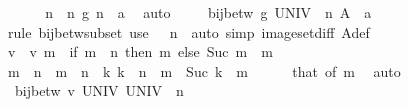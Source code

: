 \begin{isabellebody}
\ \ \isamarkupfalse%
\ {}\ \isamarkupfalse%
\ n\ \ n{\isacharcolon}{\kern0pt}\ {\isachardoublequoteopen}g\ n\ {\isacharequal}{\kern0pt}\ a{\isachardoublequoteclose}\ \isamarkupfalse%
\ auto\isanewline
\ \ \isamarkupfalse%
\ {}{\isacharcolon}{\kern0pt}\ {\isachardoublequoteopen}bij{\isacharunderscore}{\kern0pt}betw\ g\ {\isacharparenleft}{\kern0pt}UNIV\ {\isacharminus}{\kern0pt}\ {\isacharbraceleft}{\kern0pt}n{\isacharbraceright}{\kern0pt}{\isacharparenright}{\kern0pt}\ {\isacharparenleft}{\kern0pt}A{\isacharprime}{\kern0pt}\ {\isacharminus}{\kern0pt}\ {\isacharbraceleft}{\kern0pt}a{\isacharbraceright}{\kern0pt}{\isacharparenright}{\kern0pt}{\isachardoublequoteclose}\isanewline
\ \ \ \ \isamarkupfalse%
\ {\isacharparenleft}{\kern0pt}rule\ bij{\isacharunderscore}{\kern0pt}betw{\isacharunderscore}{\kern0pt}subset{\isacharparenright}{\kern0pt}\ {\isacharparenleft}{\kern0pt}use\ {}\ {}\ n\ \ {\isacartoucheopen}auto\ simp{\isacharcolon}{\kern0pt}\ image{\isacharunderscore}{\kern0pt}set{\isacharunderscore}{\kern0pt}diff\ A{\isacharprime}{\kern0pt}{\isacharunderscore}{\kern0pt}def{\isacartoucheclose}{\isacharparenright}{\kern0pt}\isanewline
\ \ \isamarkupfalse%
\ v\ \ {\isachardoublequoteopen}v\ m\ {\isacharequal}{\kern0pt}\ {\isacharparenleft}{\kern0pt}if\ m\ {\isacharless}{\kern0pt}\ n\ then\ m\ else\ Suc\ m{\isacharparenright}{\kern0pt}{\isachardoublequoteclose}\ \ m\isanewline
\ \ \isamarkupfalse%
\ {\isachardoublequoteopen}m\ {\isacharless}{\kern0pt}\ n\ {\isasymor}\ m\ {\isacharequal}{\kern0pt}\ n{\isachardoublequoteclose}\ \ {\isachardoublequoteopen}{\isasymAnd}k{\isachardot}{\kern0pt}\ k\ {\isacharless}{\kern0pt}\ n\ {\isasymor}\ m\ {\isasymnoteq}\ Suc\ k{\isachardoublequoteclose}\ \ m\isanewline
\ \ \ \ \isamarkupfalse%
\ that\ {\isacharbrackleft}{\kern0pt}of\ {\isachardoublequoteopen}m{\isacharminus}{\kern0pt}{}{\isachardoublequoteclose}{\isacharbrackright}{\kern0pt}\ \isamarkupfalse%
\ auto\isanewline
\ \ \isamarkupfalse%
\ \isamarkupfalse%
\ {}{\isacharcolon}{\kern0pt}\ {\isachardoublequoteopen}bij{\isacharunderscore}{\kern0pt}betw\ v\ UNIV\ {\isacharparenleft}{\kern0pt}UNIV\ {\isacharminus}{\kern0pt}\ {\isacharbraceleft}{\kern0pt}n{\isacharbraceright}{\kern0pt}{\isacharparenright}{\kern0pt}{\isachardoublequoteclose}\isanewline

\end{isabellebody}
